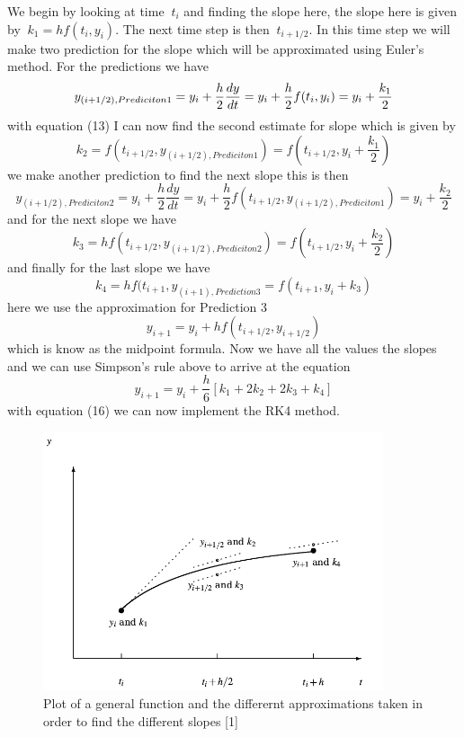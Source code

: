 \documentclass[11pt,a4wide]{article}
\begin{document}
	We begin by looking at time $\ t_i$ and finding the slope here, the slope here is given by $\ k_1=hf(t_i,y_i)$. The next time step is then $\ t_{i+1/2}$. In this time step we will make two prediction for the slope which will be approximated using Euler's method. For the predictions we have
\begin{equation}
	y_{(i+1/2),Prediciton 1} = y_i + \frac{h}{2}\frac{dy}{dt} = y_i + \frac{h}{2}f(t_i,y_i) = y_i + \frac{k_1}{2} \\
\end{equation}
with equation (13) I can now find the second estimate for slope which is given by 
\[
	k_2 =f(t_{i+1/2},y_{(i+1/2),Prediciton 1})=f(t_{i+1/2},y_i + \frac{k_1}{2})
\]
we make another prediction to find the next slope this is then 
\begin{equation}
	y_{(i+1/2),Prediciton 2} = y_i + \frac{h}{2}\frac{dy}{dt} = y_i + \frac{h}{2}f(t_{i+1/2},y_{(i+1/2),Prediciton 1}) = y_i + 	\frac{k_2}{2}
\end{equation}
and for the next slope we have
\[
	k_3 = hf(t_{i+1/2},y_{(i+1/2),Prediciton 2}) = f(t_{i+1/2},y_i +\frac{k_2}{2} )
\]
and finally for the last slope we have 
\[
	k_4 = hf(t_{i+1}, y_{(i+1),Prediction 3} = f(t_{i+1}, y_i + k_3)
\]
here we use the approximation for Prediction 3
\[
	y_{i+1} = y_i + hf(t_{i+1/2},y_{i+1/2})
\]
which is know as the midpoint formula. Now we have all the values the slopes and we can use Simpson's rule above to arrive at the equation 
\begin{equation}
	y_{i+1} = y_i + \frac{h}{6}\left[k_1 + 2k_2 + 2k_3 + k_4 \right] 
\end{equation}
with equation (16) we can now implement the RK4 method. 

\begin{figure}[H] 
\centering
\includegraphics[width=100mm]{RK4.png}
\caption{ Plot of a general function and the differernt approximations taken in order to find the different slopes [1] \label{overflow}}
\end{figure}
	
\end{document}
